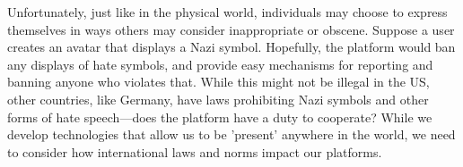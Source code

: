 Unfortunately, just like in the physical world, individuals may choose to express themselves in ways others may consider inappropriate or obscene. Suppose a user creates an avatar that displays a Nazi symbol. Hopefully, the platform would ban any displays of hate symbols, and provide easy mechanisms for reporting and banning anyone who violates that. While this might not be illegal in the US, other countries, like Germany, have laws prohibiting Nazi symbols and other forms of hate speech---does the platform have a duty to cooperate? While we develop technologies that allow us to be 'present' anywhere in the world, we need to consider how international laws and norms impact our platforms.


